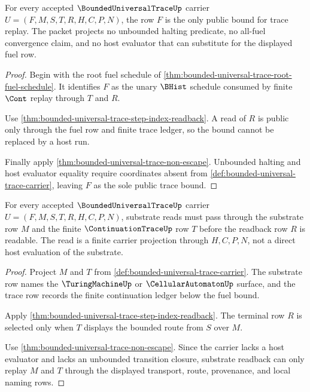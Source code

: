 \begin{theorem}
\label{thm:bounded-universal-trace-fuel-row-public-boundary}
For every accepted $\BoundedUniversalTraceUp$ carrier $U=(F,M,S,T,R,H,C,P,N)$, the row $F$ is the only public bound for trace replay. The packet projects no unbounded halting predicate, no all-fuel convergence claim, and no host evaluator that can substitute for the displayed fuel row.
\end{theorem}
\begin{proof}
Begin with the root fuel schedule of \autoref{thm:bounded-universal-trace-root-fuel-schedule}. It identifies $F$ as the unary $\BHist$ schedule consumed by finite $\Cont$ replay through $T$ and $R$.

Use \autoref{thm:bounded-universal-trace-step-index-readback}. A read of $R$ is public only through the fuel row and finite trace ledger, so the bound cannot be replaced by a host run.

Finally apply \autoref{thm:bounded-universal-trace-non-escape}. Unbounded halting and host evaluator equality require coordinates absent from \autoref{def:bounded-universal-trace-carrier}, leaving $F$ as the sole public trace bound.
\end{proof}

\begin{theorem}
\label{thm:bounded-universal-trace-substrate-trace-readback}
For every accepted $\BoundedUniversalTraceUp$ carrier $U=(F,M,S,T,R,H,C,P,N)$, substrate reads must pass through the substrate row $M$ and the finite $\ContinuationTraceUp$ row $T$ before the readback row $R$ is readable. The read is a finite carrier projection through $H,C,P,N$, not a direct host evaluation of the substrate.
\end{theorem}
\begin{proof}
Project $M$ and $T$ from \autoref{def:bounded-universal-trace-carrier}. The substrate row names the $\TuringMachineUp$ or $\CellularAutomatonUp$ surface, and the trace row records the finite continuation ledger below the fuel bound.

Apply \autoref{thm:bounded-universal-trace-step-index-readback}. The terminal row $R$ is selected only when $T$ displays the bounded route from $S$ over $M$.

Use \autoref{thm:bounded-universal-trace-non-escape}. Since the carrier lacks a host evaluator and lacks an unbounded transition closure, substrate readback can only replay $M$ and $T$ through the displayed transport, route, provenance, and local naming rows.
\end{proof}

